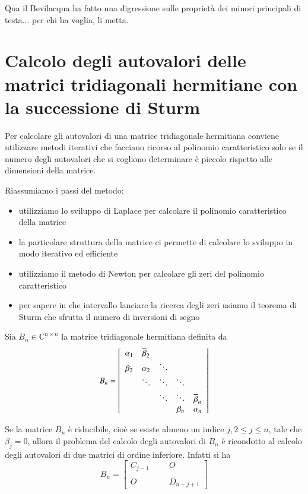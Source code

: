 \begin{workinprogress}
Qua il Bevilacqua ha fatto una digressione sulle propriet\`a
dei minori principali di testa... per chi ha voglia, li metta.
\end{workinprogress}

\section{ Calcolo degli autovalori delle matrici tridiagonali
  hermitiane con la successione di Sturm}
Per calcolare gli autovalori di una matrice tridiagonale hermitiana
conviene utilizzare metodi iterativi che facciano ricorso al
polinomio caratteristico solo se il numero degli autovalori che si
vogliono determinare \`e piccolo rispetto alle dimensioni della
matrice. 

Riassumiamo i passi del metodo:
\begin{itemize}
\item utilizziamo lo sviluppo di Laplace per calcolare il polinomio
  caratteristico della matrice
\item la particolare struttura della matrice ci permette di calcolare
  lo sviluppo in modo iterativo ed efficiente
\item utilizziamo il metodo di Newton per calcolare gli zeri del
  polinomio caratteristico
\item per sapere in che intervallo lanciare la ricerca degli zeri
  usiamo il teorema di Sturm che sfrutta il numero di inversioni di segno
\end{itemize}

Sia $B_n \in \mathbb{C}^{n \times n}$ la matrice tridiagonale
hermitiana definita da
$$
B_n =
\left[
  \begin{array}{ccccc}
    \alpha_1 & \overline{\beta}_2 &        &         &                    \\
    \beta_2  & \alpha_2           & \ddots &         &                    \\
             & \ddots             & \ddots & \ddots  &                    \\
             &                    & \ddots & \ddots  & \overline{\beta}_n \\
             &                    &        & \beta_n & \alpha_n           \\
  \end{array}
\right]
\/
$$

Se la matrice $B_n$ \`e riducibile, cio\`e se esiste
almeno un indice $j, 2 \leq j \leq n$, tale che $\beta_j = 0$, allora
il problema del calcolo degli autovalori di $B_n$ \`e ricondotto al
calcolo degli autovalori di due matrici di ordine inferiore. Infatti
si ha
$$
B_n =
\left[
  \begin{array}{llll}
    C_{j-1} &  &  & O \\
            &  &  &   \\
    O       &  &  & D_{n-j+1}
  \end{array}
\right]
$$

